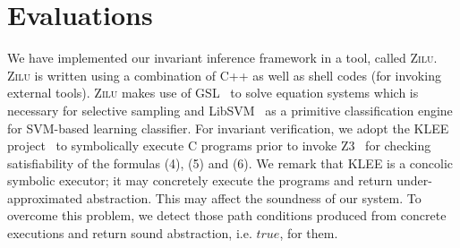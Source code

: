 
\section{Evaluations} %
\label{sec:evaluations}
We have implemented our invariant inference framework in a tool, called \textsc{Zilu}. \textsc{Zilu} is written using a combination of C++ as well as shell codes (for invoking external tools).
\textsc{Zilu} makes use of GSL~\cite{gough2009gnu} to solve equation systems which is necessary for selective sampling and
 LibSVM~\cite{chang2011libsvm} as a primitive classification engine for
SVM-based learning classifier. %
For invariant verification, we %
adopt the KLEE project~\cite{cadar2008klee} to
symbolically execute
 C programs %
prior to invoke Z3~\cite{de2008z3} for checking satisfiability of
the formulas (4), (5) and (6).
 We remark that KLEE is a concolic symbolic executor; it may
concretely execute the programs and return 
 under-approximated
abstraction. This may affect the soundness of our system.
To overcome this problem, we detect those path conditions produced from
concrete executions
and return sound abstraction, i.e. $true$, for them.

